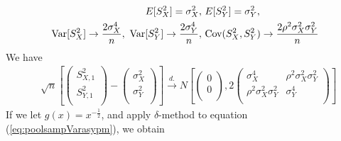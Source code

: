 \begin{equation}\label{eq:sampVarasypm}
\begin{aligned}
E[S_{X}^2] = \sigma_X^2,&~E[S_{Y}^2] = \sigma_Y^2,  \\
\text{Var}[S_{X}^2] \rightarrow \frac{2\sigma_X^4}{n},~\text{Var}[S_{Y}^2] \rightarrow 
\frac{2\sigma_Y^4}{n},&
~\text{Cov}(S_{X}^2, S_{Y}^2) \rightarrow \frac{2\rho^2\sigma_X^2\sigma_Y^2}{n} \\
\end{aligned}
\end{equation} 
We have 
\begin{equation}\label{eq:poolsampVarasypm}
\begin{aligned}
& \sqrt{n}\left[\left( \begin{array}{c}
S_{X, 1}^2\\
S_{Y, 1}^2\\
\end{array}\right)
-
\left( \begin{array}{c}
\sigma_X^2\\
\sigma_Y^2\\
\end{array}\right)
\right]
\stackrel{d.}{\longrightarrow} 
N\left[
\left(\begin{array}{c}
0\\
0\\
\end{array} \right), 
2\left(
\begin{array}{cc}
\sigma_X^4 &\rho^2\sigma_X^2\sigma_Y^2 \\
\rho^2\sigma_X^2\sigma_Y^2  &\sigma_Y^4 \\
\end{array}
\right)
\right] 
\end{aligned}
\end{equation}
If we let $g(x) = x^{-\frac{1}{2}}$, and apply $\delta$-method to equation 
(\ref{eq:poolsampVarasypm}), we obtain
